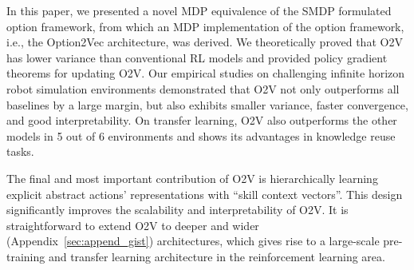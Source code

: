 \documentclass{article}
\begin{document}
In this paper, we presented a novel MDP equivalence of the SMDP
formulated option framework, from which an MDP implementation of
the option framework, i.e., the Option2Vec architecture, was
derived. We theoretically proved that O2V has lower variance than
conventional RL models and provided policy gradient theorems for
updating O2V. Our empirical studies on challenging infinite
horizon robot simulation environments demonstrated that O2V not
only outperforms all baselines by a large margin, but also
exhibits smaller variance, faster convergence, and good
interpretability. On transfer learning, O2V also outperforms the
other models in 5 out of 6 environments and shows its advantages
in knowledge reuse tasks.

The final and most important contribution of O2V is hierarchically
learning explicit abstract actions' representations with ``skill
context vectors''. This design significantly improves the
scalability and interpretability of O2V. It is straightforward to
extend O2V to deeper and wider (Appendix~\ref{sec:append_gist})
architectures, which gives rise to a large-scale pre-training and
transfer learning architecture in the reinforcement learning
area.










\end{document}
